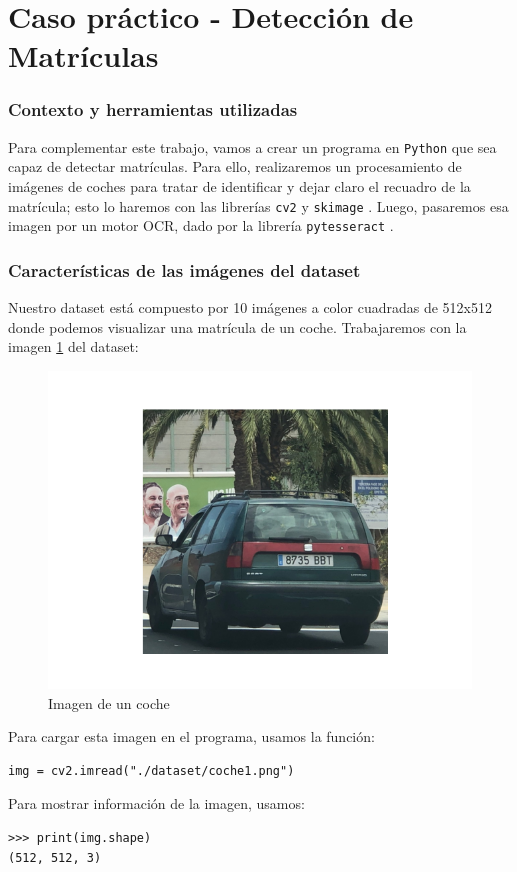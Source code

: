 \part{Caso práctico - Detección de Matrículas}
\section{Contexto y herramientas utilizadas}
Para complementar este trabajo, vamos a crear un programa en \texttt{Python} que sea capaz de detectar matrículas. Para ello, realizaremos un procesamiento de imágenes de coches para tratar de identificar y dejar claro el recuadro de la matrícula; esto lo haremos con las librerías \texttt{cv2} \cite{cv2} y \texttt{skimage} \cite{skimage}. Luego, pasaremos esa imagen por un motor OCR, dado por la librería \texttt{pytesseract} \cite{pytesseract}.

\section{Características de las imágenes del dataset}
Nuestro dataset está compuesto por 10 imágenes a color cuadradas de 512x512 donde podemos visualizar una matrícula de un coche. Trabajaremos con la imagen \ref{coche1} del dataset:

\begin{figure}[H]
    \centering
    \includegraphics[width=0.6\linewidth]{Images/coche1.png}
    \caption{Imagen de un coche}
    \label{coche1}
\end{figure}

Para cargar esta imagen en el programa, usamos la función:
\begin{verbatim}
img = cv2.imread("./dataset/coche1.png")
\end{verbatim}

Para mostrar información de la imagen, usamos:
\begin{verbatim}
>>> print(img.shape)
(512, 512, 3)
\end{verbatim}


